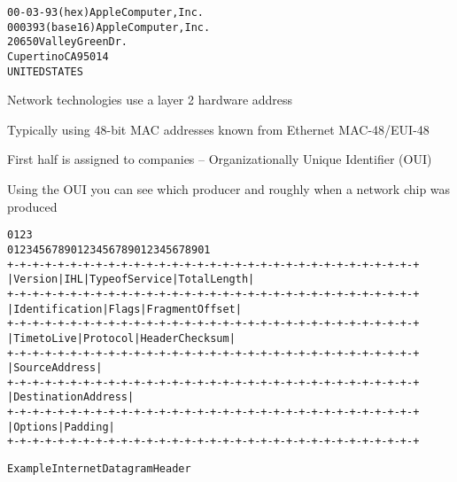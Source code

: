 \documentclass[Screen16to9,17pt]{foils}
\begin{document}
\begin{alltt}
00-03-93   (hex)        Apple Computer, Inc.
000393     (base 16)    Apple Computer, Inc.
                        20650 Valley Green Dr.
                        Cupertino CA 95014
                        UNITED STATES
\end{alltt}
\begin{list1}
\item Network technologies use a layer 2 hardware address
\item Typically using 48-bit MAC addresses known from Ethernet MAC-48/EUI-48
\item First half is assigned to companies -- Organizationally Unique Identifier (OUI)
\item Using the OUI you can see which producer and roughly when a network chip was produced
\item {}
\end{list1}





\begin{alltt}
\small
    0                   1                   2                   3
    0 1 2 3 4 5 6 7 8 9 0 1 2 3 4 5 6 7 8 9 0 1 2 3 4 5 6 7 8 9 0 1
   +-+-+-+-+-+-+-+-+-+-+-+-+-+-+-+-+-+-+-+-+-+-+-+-+-+-+-+-+-+-+-+-+
   |Version|  IHL  |Type of Service|          Total Length         |
   +-+-+-+-+-+-+-+-+-+-+-+-+-+-+-+-+-+-+-+-+-+-+-+-+-+-+-+-+-+-+-+-+
   |         Identification        |Flags|      Fragment Offset    |
   +-+-+-+-+-+-+-+-+-+-+-+-+-+-+-+-+-+-+-+-+-+-+-+-+-+-+-+-+-+-+-+-+
   |  Time to Live |    Protocol   |         Header Checksum       |
   +-+-+-+-+-+-+-+-+-+-+-+-+-+-+-+-+-+-+-+-+-+-+-+-+-+-+-+-+-+-+-+-+
   |                       Source Address                          |
   +-+-+-+-+-+-+-+-+-+-+-+-+-+-+-+-+-+-+-+-+-+-+-+-+-+-+-+-+-+-+-+-+
   |                    Destination Address                        |
   +-+-+-+-+-+-+-+-+-+-+-+-+-+-+-+-+-+-+-+-+-+-+-+-+-+-+-+-+-+-+-+-+
   |                    Options                    |    Padding    |
   +-+-+-+-+-+-+-+-+-+-+-+-+-+-+-+-+-+-+-+-+-+-+-+-+-+-+-+-+-+-+-+-+

                    Example Internet Datagram Header
\end{alltt}




\end{document}
